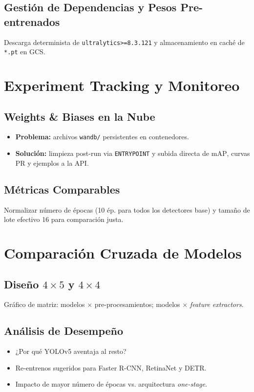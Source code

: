 \subsection{Gestión de Dependencias y Pesos Pre-entrenados}
Descarga determinista de
\texttt{ultralytics>=8.3.121} y
almacenamiento en caché de \texttt{*.pt} en GCS.

\section{Experiment Tracking y Monitoreo}\label{sec:tracking}
\subsection{Weights \& Biases en la Nube}
\begin{itemize}
   \item \textbf{Problema:} archivos \texttt{wandb/}
         persistentes en contenedores.
   \item \textbf{Solución:} limpieza post-run
         via \texttt{ENTRYPOINT} y subida
         directa de \(\text{mAP}\), curvas PR y ejemplos a la API.
\end{itemize}

\subsection{Métricas Comparables}\label{ssec:metricas}
Normalizar número de épocas (10 ép. para
todos los detectores base) y tamaño de lote
efectivo 16 para comparación justa.

\section{Comparación Cruzada de Modelos}\label{sec:comparacion}
\subsection{Diseño \(4\times5\) y \(4\times4\)}
Gráfico de matriz:
modelos × pre-procesamientos;
modelos × \emph{feature extractors}.

\subsection{Análisis de Desempeño}
\begin{itemize}
    \item ¿Por qué YOLOv5 aventaja al resto?
    \item Re‐entrenos sugeridos para Faster R-CNN, RetinaNet y DETR.
    \item Impacto de mayor número de épocas vs.
          arquitectura \emph{one-stage}.
\end{itemize}


